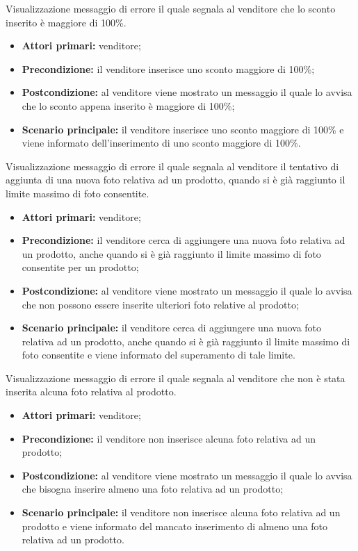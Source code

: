 Visualizzazione messaggio di errore il quale segnala al venditore che lo sconto inserito è maggiore di 100\%.
\begin{itemize}
    \item \textbf{Attori primari:} venditore;
    \item \textbf{Precondizione:} il venditore inserisce uno sconto maggiore di 100\%;
    \item \textbf{Postcondizione:} al venditore viene mostrato un messaggio il quale lo avvisa che lo sconto appena inserito è maggiore di 100\%;
    \item \textbf{Scenario principale:} il venditore inserisce uno sconto maggiore di 100\% e viene informato dell'inserimento di uno sconto maggiore di 100\%.
\end{itemize}

Visualizzazione messaggio di errore il quale segnala al venditore il tentativo di aggiunta di una nuova foto relativa ad un prodotto, quando si è già raggiunto il limite massimo di foto consentite.
\begin{itemize}
    \item \textbf{Attori primari:} venditore;
    \item \textbf{Precondizione:} il venditore cerca di aggiungere una nuova foto relativa ad un prodotto, anche quando si è già raggiunto il limite massimo di foto consentite per un prodotto;
    \item \textbf{Postcondizione:} al venditore viene mostrato un messaggio il quale lo avvisa che non possono essere inserite ulteriori foto relative al prodotto;
    \item \textbf{Scenario principale:} il venditore cerca di aggiungere una nuova foto relativa ad un prodotto, anche quando si è già raggiunto il limite massimo di foto consentite e viene informato del superamento di tale limite.
\end{itemize}

Visualizzazione messaggio di errore il quale segnala al venditore che non è stata inserita alcuna foto relativa al prodotto.
\begin{itemize}
    \item \textbf{Attori primari:} venditore;
    \item \textbf{Precondizione:} il venditore non inserisce alcuna foto relativa ad un prodotto;
    \item \textbf{Postcondizione:} al venditore viene mostrato un messaggio il quale lo avvisa che bisogna inserire almeno una foto relativa ad un prodotto;
    \item \textbf{Scenario principale:} il venditore non inserisce alcuna foto relativa ad un prodotto e viene informato del mancato inserimento di almeno una foto relativa ad un prodotto.
\end{itemize}

